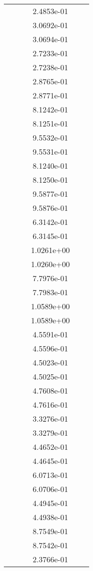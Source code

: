 \begin{xltabular}{\textwidth}{r|rS[table-format=1.3e+2]S[table-format=1.4e+2]S[table-format=1.4e+2]S[table-format=-1.5]}
&  &  & 2.4853e-01 & & \\
&  &  & 3.0692e-01 & & \\
&  &  & 3.0694e-01 & & \\
&  &  & 2.7233e-01 & & \\
&  &  & 2.7238e-01 & & \\
&  &  & 2.8765e-01 & & \\
&  &  & 2.8771e-01 & & \\
&  &  & 8.1242e-01 & & \\
&  &  & 8.1251e-01 & & \\
&  &  & 9.5532e-01 & & \\
&  &  & 9.5531e-01 & & \\
&  &  & 8.1240e-01 & & \\
&  &  & 8.1250e-01 & & \\
&  &  & 9.5877e-01 & & \\
&  &  & 9.5876e-01 & & \\
&  &  & 6.3142e-01 & & \\
&  &  & 6.3145e-01 & & \\
&  &  & 1.0261e+00 & & \\
&  &  & 1.0260e+00 & & \\
&  &  & 7.7976e-01 & & \\
&  &  & 7.7983e-01 & & \\
&  &  & 1.0589e+00 & & \\
&  &  & 1.0589e+00 & & \\
&  &  & 4.5591e-01 & & \\
&  &  & 4.5596e-01 & & \\
&  &  & 4.5023e-01 & & \\
&  &  & 4.5025e-01 & & \\
&  &  & 4.7608e-01 & & \\
&  &  & 4.7616e-01 & & \\
&  &  & 3.3276e-01 & & \\
&  &  & 3.3279e-01 & & \\
&  &  & 4.4652e-01 & & \\
&  &  & 4.4645e-01 & & \\
&  &  & 6.0713e-01 & & \\
&  &  & 6.0706e-01 & & \\
&  &  & 4.4945e-01 & & \\
&  &  & 4.4938e-01 & & \\
&  &  & 8.7549e-01 & & \\
&  &  & 8.7542e-01 & & \\
&  &  & 2.3766e-01 & & \\

\end{xltabular}
